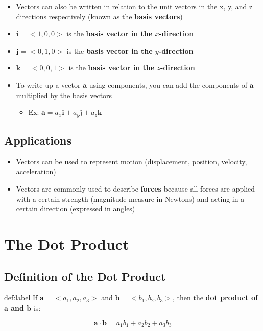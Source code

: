 \documentclass{package/notes}
\begin{document}
\begin{itemize}
	\item Vectors can also be written in relation to the unit vectors in the x, y, and z directions respectively (known as the \textbf{basis vectors})
	\item $\mathbf{i} = <1,0,0>$ is the \textbf{basis vector in the $x$-direction}
	\item $\mathbf{j} = <0,1,0>$ is the \textbf{basis vector in the $y$-direction}
	\item $\mathbf{k} = <0,0,1>$ is the \textbf{basis vector in the $z$-direction}
	\item To write up a vector $\mathbf a$ using components, you can add the components of $\mathbf a$ multiplied by the basis vectors
	\begin{itemize}
		\item Ex: $\mathbf a = a_x\mathbf i + a_y\mathbf j + a_z\mathbf k$
	\end{itemize}
\end{itemize}

\subsection{Applications}

\begin{itemize}
	\item Vectors can be used to represent motion (displacement, position, velocity, acceleration)
	\item Vectors are commonly used to describe \textbf{forces} because all forces are applied with a certain strength (magnitude measure in Newtons) and acting in a certain direction (expressed in angles)
\end{itemize}



\section{The Dot Product}

\subsection{Definition of the Dot Product}

\begin{definition}{def:label}
	If $\mathbf{a} = <a_1, a_2, a_3>$ and $\mathbf{b} = <b_1, b_2, b_3>$, then the \textbf{dot product of $\mathbf{a}$ and $\mathbf{b}$} is:

	$$\mathbf a \cdot \mathbf b = a_1b_1 + a_2b_2 + a_3b_3$$
\end{definition}
\end{document}
